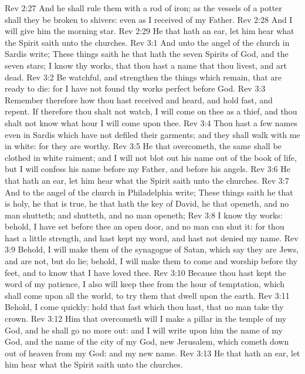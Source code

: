 \vs Rev 2:27 And he shall rule them with a rod of iron; as the vessels of a potter shall they be broken to shivers: even as I received of my Father.
\vs Rev 2:28 And I will give him the morning star.
\vs Rev 2:29 He that hath an ear, let him hear what the Spirit saith unto the churches.
\vs Rev 3:1 And unto the angel of the church in Sardis write; These things saith he that hath the seven Spirits of God, and the seven stars; I know thy works, that thou hast a name that thou livest, and art dead.
\vs Rev 3:2 Be watchful, and strengthen the things which remain, that are ready to die: for I have not found thy works perfect before God.
\vs Rev 3:3 Remember therefore how thou hast received and heard, and hold fast, and repent. If therefore thou shalt not watch, I will come on thee as a thief, and thou shalt not know what hour I will come upon thee.
\vs Rev 3:4 Thou hast a few names even in Sardis which have not defiled their garments; and they shall walk with me in white: for they are worthy.
\vs Rev 3:5 He that overcometh, the same shall be clothed in white raiment; and I will not blot out his name out of the book of life, but I will confess his name before my Father, and before his angels.
\vs Rev 3:6 He that hath an ear, let him hear what the Spirit saith unto the churches.
\vs Rev 3:7 And to the angel of the church in Philadelphia write; These things saith he that is holy, he that is true, he that hath the key of David, he that openeth, and no man shutteth; and shutteth, and no man openeth;
\vs Rev 3:8 I know thy works: behold, I have set before thee an open door, and no man can shut it: for thou hast a little strength, and hast kept my word, and hast not denied my name.
\vs Rev 3:9 Behold, I will make them of the synagogue of Satan, which say they are Jews, and are not, but do lie; behold, I will make them to come and worship before thy feet, and to know that I have loved thee.
\vs Rev 3:10 Because thou hast kept the word of my patience, I also will keep thee from the hour of temptation, which shall come upon all the world, to try them that dwell upon the earth.
\vs Rev 3:11 Behold, I come quickly: hold that fast which thou hast, that no man take thy crown.
\vs Rev 3:12 Him that overcometh will I make a pillar in the temple of my God, and he shall go no more out: and I will write upon him the name of my God, and the name of the city of my God,  new Jerusalem, which cometh down out of heaven from my God: and  my new name.
\vs Rev 3:13 He that hath an ear, let him hear what the Spirit saith unto the churches.
